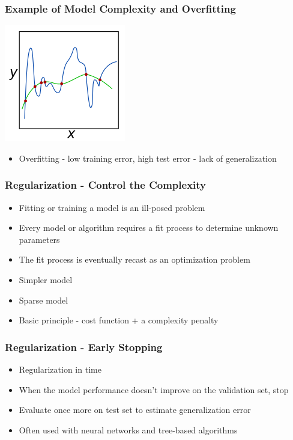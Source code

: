 \documentclass{beamer}
\begin{document}
\begin{frame}
\frametitle{Example of Model Complexity and Overfitting}
\includegraphics{overfit}
\begin{itemize}
\item Overfitting - low training error, high test error - lack of generalization
\end{itemize}
\end{frame}

\begin{frame}
\frametitle{Regularization - Control the Complexity}
\begin{itemize}
\item Fitting or training a model is an ill-posed problem
\item Every model or algorithm requires a fit process to determine unknown parameters
\item The fit process is eventually recast as an optimization problem
\item Simpler model
\item Sparse model
\item Basic principle - cost function + a complexity penalty
\end{itemize}
\end{frame}

\begin{frame}
\frametitle{Regularization - Early Stopping}
\begin{itemize}
\item Regularization in time
\item When the model performance doesn't improve on the validation set, stop
\item Evaluate once more on test set to estimate generalization error
\item Often used with neural networks and tree-based algorithms
\end{itemize}
\end{frame}
\end{document}

